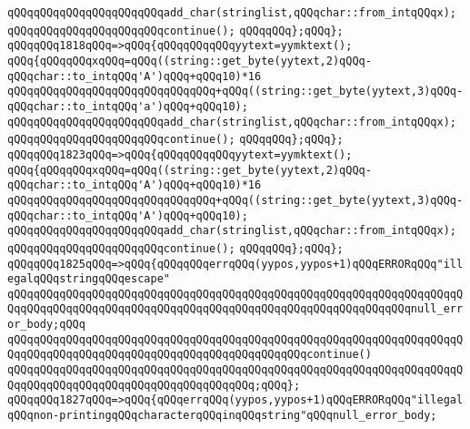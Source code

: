 \verb|qQQqqQQqqQQqqQQqqQQqqQQqadd_char(stringlist,qQQqchar::from_intqQQqx);|\newline
\verb|qQQqqQQqqQQqqQQqqQQqqQQqcontinue();|\newline
\verb|qQQqqQQq};qQQq};|\newline
\verb|qQQqqQQq1818qQQq=>qQQq{qQQqqQQqqQQqyytext=yymktext();|\newline
\verb|qQQq{qQQqqQQqxqQQq=qQQq((string::get_byte(yytext,2)qQQq-qQQqchar::to_intqQQq'A')qQQq+qQQq10)*16|\newline
\verb|qQQqqQQqqQQqqQQqqQQqqQQqqQQqqQQq+qQQq((string::get_byte(yytext,3)qQQq-qQQqchar::to_intqQQq'a')qQQq+qQQq10);|\newline
\verb|qQQqqQQqqQQqqQQqqQQqqQQqadd_char(stringlist,qQQqchar::from_intqQQqx);|\newline
\verb|qQQqqQQqqQQqqQQqqQQqqQQqcontinue();|\newline
\verb|qQQqqQQq};qQQq};|\newline
\verb|qQQqqQQq1823qQQq=>qQQq{qQQqqQQqqQQqyytext=yymktext();|\newline
\verb|qQQq{qQQqqQQqxqQQq=qQQq((string::get_byte(yytext,2)qQQq-qQQqchar::to_intqQQq'A')qQQq+qQQq10)*16|\newline
\verb|qQQqqQQqqQQqqQQqqQQqqQQqqQQqqQQq+qQQq((string::get_byte(yytext,3)qQQq-qQQqchar::to_intqQQq'A')qQQq+qQQq10);|\newline
\verb|qQQqqQQqqQQqqQQqqQQqqQQqadd_char(stringlist,qQQqchar::from_intqQQqx);|\newline
\verb|qQQqqQQqqQQqqQQqqQQqqQQqcontinue();|\newline
\verb|qQQqqQQq};qQQq};|\newline
\verb|qQQqqQQq1825qQQq=>qQQq{qQQqqQQqerrqQQq(yypos,yypos+1)qQQqERRORqQQq"illegalqQQqstringqQQqescape"|\newline
\verb|qQQqqQQqqQQqqQQqqQQqqQQqqQQqqQQqqQQqqQQqqQQqqQQqqQQqqQQqqQQqqQQqqQQqqQQqqQQqqQQqqQQqqQQqqQQqqQQqqQQqqQQqqQQqqQQqqQQqqQQqqQQqqQQqqQQqnull_error_body;qQQq|\newline
\verb|qQQqqQQqqQQqqQQqqQQqqQQqqQQqqQQqqQQqqQQqqQQqqQQqqQQqqQQqqQQqqQQqqQQqqQQqqQQqqQQqqQQqqQQqqQQqqQQqqQQqqQQqqQQqqQQqqQQqcontinue()|\newline
\verb|qQQqqQQqqQQqqQQqqQQqqQQqqQQqqQQqqQQqqQQqqQQqqQQqqQQqqQQqqQQqqQQqqQQqqQQqqQQqqQQqqQQqqQQqqQQqqQQqqQQqqQQqqQQq;qQQq};|\newline
\verb|qQQqqQQq1827qQQq=>qQQq{qQQqerrqQQq(yypos,yypos+1)qQQqERRORqQQq"illegalqQQqnon-printingqQQqcharacterqQQqinqQQqstring"qQQqnull_error_body;|\newline
